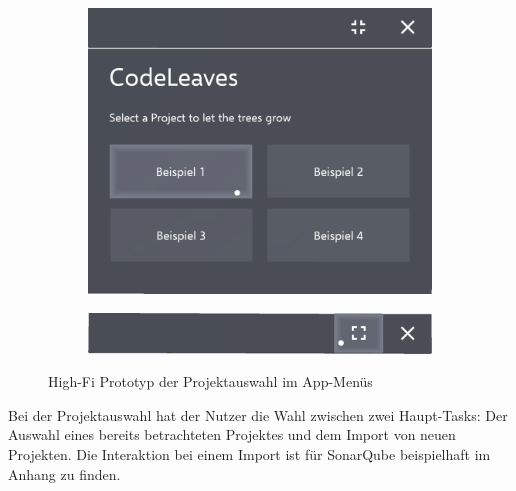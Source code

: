 \begin{figure}[htb]
  \centering
  \begin{subfigure}[t]{\textwidth}
    \centering
    \includegraphics[width=.8\textwidth]{figures/project-selection}
     \label{fig:project-selection}
  \end{subfigure}
  \par\bigskip
  \begin{subfigure}[t]{\textwidth}
    \centering
  	\includegraphics[width=.8\textwidth]{figures/title-bar}
  	 \label{fig:title-bar}
  \end{subfigure}
  \caption{High-Fi Prototyp der Projektauswahl im App-Menüs} \label{fig:app-menu}
\end{figure}


Bei der Projektauswahl hat der Nutzer die Wahl zwischen zwei Haupt-Tasks: Der Auswahl eines bereits betrachteten Projektes und dem Import von neuen Projekten. Die Interaktion bei einem Import ist für SonarQube beispielhaft im Anhang zu finden.

